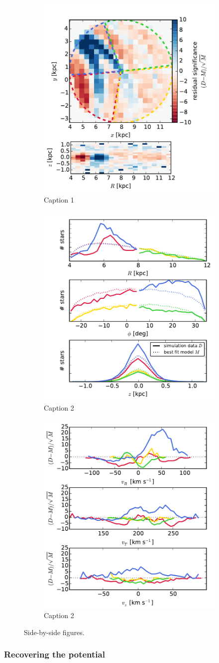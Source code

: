 \documentclass[iop,revtex4,numberedappendix,appendixfloats]{emulateapj}
\begin{document}
\begin{figure}[!htbp]
  \centering
  \begin{subfigure}
    \centering
    \includegraphics[width=.3\linewidth]{fig/MNdHHdiffSph2_4kpc8Spiral_a_test1_data_bestfit_residuals_3a.pdf}
    \caption{Caption 1}
    \label{fig:???}
  \end{subfigure}%
  \quad
  \begin{subfigure}
    \centering
    \includegraphics[width=.3\linewidth]{fig/MNdHHdiffSph2_4kpc8Spiral_a_test1_data_bestfit_residuals_3b.pdf}
    \caption{Caption 2}
    \label{fig:???}
  \end{subfigure}%
  \quad
  \begin{subfigure}
    \centering
    \includegraphics[width=.3\linewidth]{fig/MNdHHdiffSph2_4kpc8Spiral_a_test1_data_bestfit_residuals_3c.pdf}
    \caption{Caption 2}
    \label{fig:???}
  \end{subfigure}
  \caption{Side-by-side figures.}
  \label{fig:???}
\end{figure}


\subsubsection{Recovering the potential}
\end{document}
